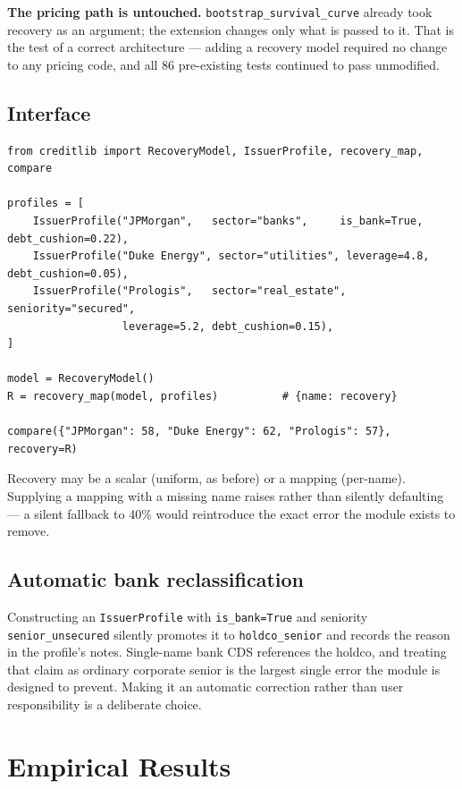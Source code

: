 \documentclass[11pt,a4paper]{article}
\newcommand{\keypoint}[1]{\par\vspace{0.4em}\noindent
  \colorbox{codebg}{\parbox{\dimexpr\linewidth-2\fboxsep}{\small #1}}\par\vspace{0.5em}}
\begin{document}
\keypoint{\textbf{The pricing path is untouched.} \texttt{bootstrap\_survival\_curve}
already took recovery as an argument; the extension changes only what is passed to it.
That is the test of a correct architecture --- adding a recovery model required no
change to any pricing code, and all 86 pre-existing tests continued to pass unmodified.}

\subsection{Interface}

\begin{lstlisting}
from creditlib import RecoveryModel, IssuerProfile, recovery_map, compare

profiles = [
    IssuerProfile("JPMorgan",   sector="banks",     is_bank=True, debt_cushion=0.22),
    IssuerProfile("Duke Energy", sector="utilities", leverage=4.8, debt_cushion=0.05),
    IssuerProfile("Prologis",   sector="real_estate", seniority="secured",
                  leverage=5.2, debt_cushion=0.15),
]

model = RecoveryModel()
R = recovery_map(model, profiles)          # {name: recovery}

compare({"JPMorgan": 58, "Duke Energy": 62, "Prologis": 57}, recovery=R)
\end{lstlisting}

Recovery may be a scalar (uniform, as before) or a mapping (per-name). Supplying a
mapping with a missing name raises rather than silently defaulting --- a silent fallback
to 40\% would reintroduce the exact error the module exists to remove.

\subsection{Automatic bank reclassification}

Constructing an \texttt{IssuerProfile} with \texttt{is\_bank=True} and seniority
\texttt{senior\_unsecured} silently promotes it to \texttt{holdco\_senior} and records
the reason in the profile's notes. Single-name bank CDS references the holdco, and
treating that claim as ordinary corporate senior is the largest single error the module
is designed to prevent. Making it an automatic correction rather than user
responsibility is a deliberate choice.

\section{Empirical Results}
\end{document}
